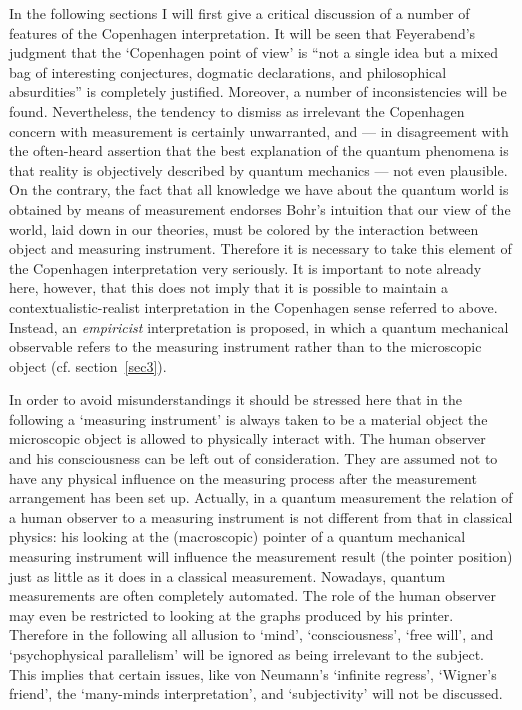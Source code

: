 \documentclass[12pt]{article}
\begin{document}
In the following sections I will first give a critical discussion
of a number of features of the Copenhagen interpretation. It will
be seen that Feyerabend's \cite{Feyerabend68} judgment that the
`Copenhagen point of view' is ``not a single idea but a mixed bag
of interesting conjectures, dogmatic declarations, and
philosophical absurdities'' is completely justified. Moreover, a
number of inconsistencies will be found. Nevertheless, the
tendency to dismiss as irrelevant the Copenhagen concern with
measurement is certainly unwarranted, and --- in disagreement with
the often-heard assertion that the best explanation of the quantum
phenomena is that reality is objectively described by quantum
mechanics --- not even plausible. On the contrary, the fact that all
knowledge we have about the quantum world is obtained by means of
measurement endorses Bohr's intuition that our view of the world,
laid down in our theories, must be colored by the interaction
between object and measuring instrument. Therefore it is necessary
to take this element of the Copenhagen interpretation very
seriously. It is important to note already here, however, that
this does not imply that it is possible to maintain a
contextualistic-realist interpretation in the Copenhagen sense
referred to above. Instead, an {\em empiricist} interpretation is
proposed, in which a quantum mechanical observable refers to the
measuring instrument rather than to the microscopic object (cf.
section~\ref{sec3}).

In order to avoid misunderstandings it should be stressed here
that in the following a `measuring instrument' is always taken to
be a material object the microscopic object is allowed to
physically interact with. The human observer and his consciousness
can be left out of consideration. They are assumed not to have any
physical influence on the measuring process after the measurement
arrangement has been set up. Actually, in a quantum measurement
the relation of a human observer to a measuring instrument is not
different from that in classical physics: his looking at the
(macroscopic) pointer of a quantum mechanical measuring instrument
will influence the measurement result (the pointer position) just
as little as it does in a classical measurement. Nowadays, quantum
measurements are often completely automated. The role of the human
observer may even be restricted to looking at the graphs produced
by his printer. Therefore in the following all allusion to `mind',
`consciousness', `free will', and `psychophysical parallelism'
will be ignored as being irrelevant to the subject. This implies
that certain issues, like von Neumann's `infinite regress',
`Wigner's friend', the `many-minds interpretation', and
`subjectivity' will not be discussed.
\end{document}
